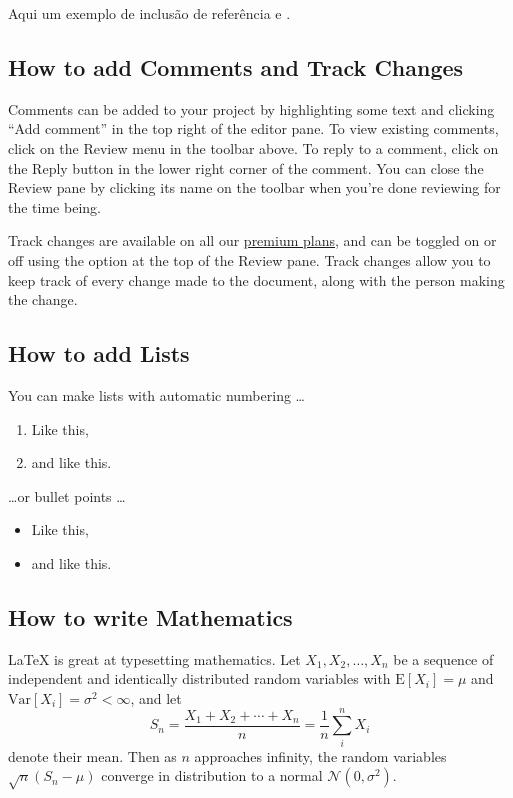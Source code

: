 \documentclass[11pt]{article}
\begin{document}
Aqui um exemplo de inclusão de referência \cite{florenzano2007iniciaccao} e \cite{liu2015aplicaccoes}.


\subsection{How to add Comments and Track Changes}

Comments can be added to your project by highlighting some text and clicking ``Add comment'' in the top right of the editor pane. To view existing comments, click on the Review menu in the toolbar above. To reply to a comment, click on the Reply button in the lower right corner of the comment. You can close the Review pane by clicking its name on the toolbar when you're done reviewing for the time being.

Track changes are available on all our \href{https://www.overleaf.com/user/subscription/plans}{premium plans}, and can be toggled on or off using the option at the top of the Review pane. Track changes allow you to keep track of every change made to the document, along with the person making the change. 

\subsection{How to add Lists}

You can make lists with automatic numbering \dots

\begin{enumerate}
\item Like this,
\item and like this.
\end{enumerate}
\dots or bullet points \dots
\begin{itemize}
\item Like this,
\item and like this.
\end{itemize}

\subsection{How to write Mathematics}

\LaTeX{} is great at typesetting mathematics. Let $X_1, X_2, \ldots, X_n$ be a sequence of independent and identically distributed random variables with $\text{E}[X_i] = \mu$ and $\text{Var}[X_i] = \sigma^2 < \infty$, and let
\[S_n = \frac{X_1 + X_2 + \cdots + X_n}{n}
      = \frac{1}{n}\sum_{i}^{n} X_i\]
denote their mean. Then as $n$ approaches infinity, the random variables $\sqrt{n}(S_n - \mu)$ converge in distribution to a normal $\mathcal{N}(0, \sigma^2)$.
\end{document}
